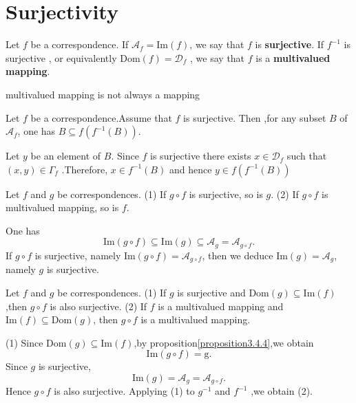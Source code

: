 \documentclass{book}
\numberwithin{equation}{section}
\begin{document}
\section{Surjectivity}
\begin{definitionenv}
    Let $f$ be a correspondence. If $\mathscr{A}_f=\mathrm{Im}(f)$, we say that $f$ is \textbf{surjective}. If $f^{-1}$ is surjective , or equivalently $\mathrm{Dom}(f)=\mathscr{D}_f$ , we say that $f$ is a \textbf{multivalued mapping}.
\end{definitionenv}
\begin{remark}
    multivalued mapping is not always a mapping
\end{remark}
\begin{propositionenv}\label{proposition3.5.1}
    Let $f$ be a correspondence.Assume that $f$ is surjective. Then ,for any subset $B$ of $\mathscr{A}_f$, one has $B\subseteq f(f^{-1}(B))$.
\end{propositionenv}
\begin{proofenv}
    Let $y$ be an element of $B$. Since $f$ is surjective there exists $x\in \mathscr{D}_f$ such that $(x,y)\in \Gamma_f$ .Therefore, $x\in f^{-1}(B)$ and hence $y\in f(f^{-1}(B))$
\end{proofenv}
\begin{propositionenv}\label{proposition3.5.2}
    Let $f$ and $g$ be correspondences.
    \newline
    (1) If $g\circ f$ is surjective, so is $g$.
    \newline
    (2) If $g\circ f$ is multivalued mapping, so is $f$.
\end{propositionenv}
\begin{proofenv}
    One has 
    $$\mathrm{Im}(g\circ f)\subseteq \mathrm{Im}(g)\subseteq \mathscr{A}_g=\mathscr{A}_{g\circ f}.$$
    If $g\circ f $ is surjective, namely $\mathrm{Im}(g\circ f )=\mathscr{A}_{g\circ f}$, then we deduce $\mathrm{Im}(g)=\mathscr{A}_g$, namely $g$ is surjective.
\end{proofenv}
\begin{propositionenv}\label{proposition3.5.3}
    Let $f$ and $g$ be correspondences.
    \newline
    (1) If $g$ is surjective and $\mathrm{Dom}(g)\subseteq \mathrm{Im}(f)$,then $g\circ f $ is also surjective.
    \newline
    (2) If $f$ is a multivalued mapping and $\mathrm{Im}(f)\subseteq \mathrm{Dom}(g)$, then $g\circ f $ is a multivalued mapping.
\end{propositionenv}
\begin{proofenv}
    (1) Since $\mathrm{Dom}(g)\subseteq \mathrm{Im}(f)$,by proposition\ref{proposition3.4.4},we obtain 
    $$\mathrm{Im}(g\circ f )=\mathrm{g}.$$
    Since $g$ is surjective,
    $$\mathrm{Im}(g)=\mathscr{A}_g=\mathscr{A}_{g\circ f}.$$
    Hence $g\circ f $ is also surjective.
    \newline
    Applying (1) to $g^{-1}$ and $f^{-1}$ ,we obtain (2).
\end{proofenv}
\end{document}
